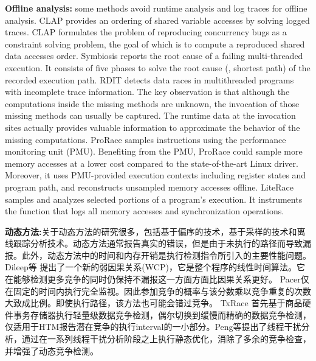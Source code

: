 \textbf{Offline analysis:} some methods avoid runtime analysis and log traces for offline analysis.
CLAP \cite{huang2013clap} provides an ordering of shared variable accesses by solving logged traces. 
CLAP formulates the problem of reproducing concurrency bugs as a constraint solving problem, the goal of which is to compute a reproduced shared data accesses order.
Symbiosis \cite{machado2015concurrency} reports the root cause of a failing multi-threaded execution. 
It consists of five phases to solve the root cause (\ie, shortest path) of the recorded execution path.
RDIT \cite{huang2016precise} detects data races in multithreaded programs with incomplete trace information. 
The key observation is that although the computations inside the missing methods are unknown, the invocation of those missing methods can usually be captured. 
The runtime data at the invocation sites actually provides valuable information to approximate the behavior of the missing computations.
ProRace \cite{zhang2017prorace} samples instructions using the performance monitoring unit (PMU). 
Benefiting from the PMU, ProRace could sample more memory accesses at a lower cost compared to the state-of-the-art Linux driver. 
Moreover, it uses PMU-provided execution contexts including register states and program path, and reconstructs unsampled memory accesses offline.
LiteRace \cite{marino2009literace} samples and analyzes selected portions of a program's execution. 
It instruments the function that logs all memory accesses and synchronization operations.

\textbf{动态方法:}关于动态方法的研究很多，包括基于偏序的技术\cite{kini2017dynamic}，基于采样的技术\cite{marino2009literace, bond2010pacer}和离线跟踪分析技术\cite{huang2013clap, machado2015concurrency, huang2016precise, zhang2017prorace}。动态方法通常报告真实的错误，但是由于未执行的路径而导致漏报。此外，动态方法中的时间和内存开销是执行检测指令所引入的主要性能问题。 Dileep等\cite{kini2017dynamic} 提出了一个新的弱因果关系(WCP)，它是整个程序的线性时间算法。它在能够检测更多竞争的同时仍保持不漏报这一方面方面比因果关系更好。 Pacer\cite{bond2010pacer}仅在固定的时间内执行完全监视。因此参加竞争的概率与该分数乘以竞争重复的次数大致成比例。即使执行路径，该方法也可能会错过竞争。 TxRace \cite{zhang2016txrace} 首先基于商品硬件事务存储器执行轻量级数据竞争检测，偶尔切换到缓慢而精确的数据竞争检测，仅适用于HTM报告潜在竞争的执行interval的一小部分。Peng等\cite{di2016accelerating}提出了线程干扰分析，通过在一系列线程干扰分析阶段之上执行静态优化，消除了多余的竞争检查，并增强了动态竞争检测。

